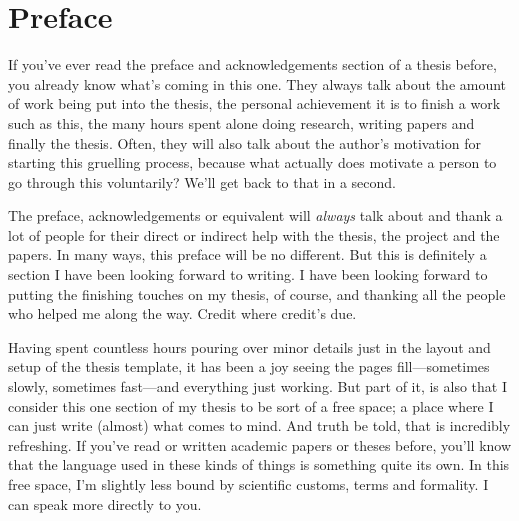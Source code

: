 \chapter*{Preface}\label{acknow}
If you've ever read the preface and acknowledgements section of a \PhD{} thesis before, you already know what's coming in this one.
They always talk about the amount of work being put into the thesis, the personal achievement it is to finish a work such as this, the many hours spent alone doing research, writing papers and finally the thesis.
Often, they will also talk about the author's motivation for starting this gruelling process, because what actually does motivate a person to go through this voluntarily?
We'll get back to that in a second.

The preface, acknowledgements or equivalent will \emph{always} talk about and thank a lot of people for their direct or indirect help with the thesis, the project and the papers.
In many ways, this preface will be no different.
But this is definitely a section I have been looking forward to writing.
I have been looking forward to putting the finishing touches on my thesis, of course, and thanking all the people who helped me along the way.
Credit where credit's due.

Having spent countless hours pouring over minor details just in the layout and setup of the thesis template, it has been a joy seeing the pages fill---sometimes slowly, sometimes fast---and everything just working.
But part of it, is also that I consider this one section of my thesis to be sort of a free space; a place where I can just write (almost) what comes to mind.
And truth be told, that is incredibly refreshing.
If you've read or written academic papers or theses before, you'll know that the language used in these kinds of things is something quite its own.
In this free space, I'm slightly less bound by scientific customs, terms and formality.
I can speak more directly to you.

